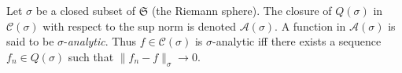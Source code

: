 Let $\sigma$ be a closed subset of $\mathfrak{S}$ (the Riemann sphere). The closure of $Q(\sigma)$ in $\mathcal{C}(\sigma)$ with respect to the sup norm is denoted $\mathcal{A}(\sigma)$. A function in $\mathcal{A}(\sigma)$ is said to be $\sigma$-\textit{analytic}. Thus $f \in \mathcal{C}(\sigma)$ is $\sigma$-analytic iff there exists a sequence $f_n \in Q(\sigma)$ such that $\|f_n - f\|_\sigma \to 0$.
